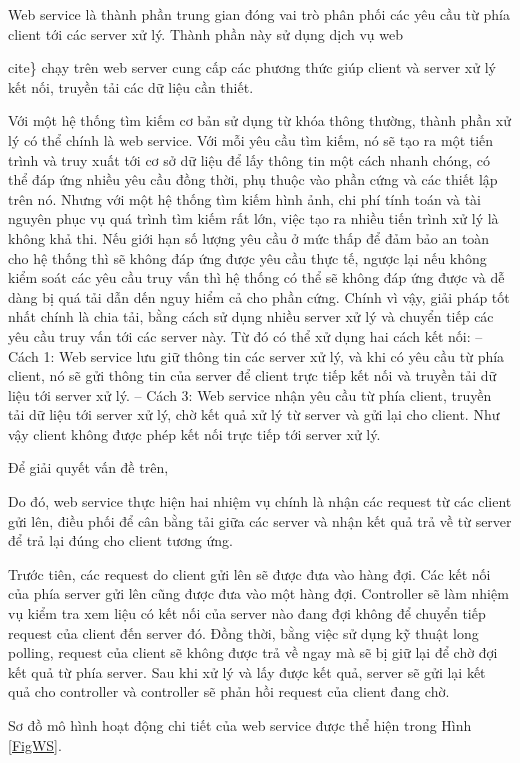 Web service là thành phần trung gian đóng vai trò phân phối các yêu cầu từ phía client tới các server xử lý. Thành phần này sử dụng dịch vụ web {cite\} chạy trên web server cung cấp các phương thức giúp client và server xử lý kết nối, truyền tải các dữ liệu cần thiết.

Với một hệ thống tìm kiếm cơ bản sử dụng từ khóa thông thường, thành phần xử lý có thể chính là web service. Với mỗi yêu cầu tìm kiếm, nó sẽ tạo ra một tiến trình và truy xuất tới cơ sở dữ liệu để lấy thông tin một cách nhanh chóng, có thể đáp ứng nhiều yêu cầu đồng thời, phụ thuộc vào phần cứng và các thiết lập trên nó. Nhưng với một hệ thống tìm kiếm hình ảnh, chi phí tính toán và tài nguyên phục vụ quá trình tìm kiếm rất lớn, việc tạo ra nhiều tiến trình xử lý là không khả thi. Nếu giới hạn số lượng yêu cầu ở mức thấp để đảm bảo an toàn cho hệ thống thì sẽ không đáp ứng được yêu cầu thực tế, ngược lại nếu không kiểm soát các yêu cầu truy vấn thì hệ thống có thể sẽ không đáp ứng được và dễ dàng bị quá tải dẫn dến nguy hiểm cả cho phần cứng. Chính vì vậy, giải pháp tốt nhất chính là chia tải, bằng cách sử dụng nhiều server xử lý và chuyển tiếp các yêu cầu truy vấn tới các server này. Từ đó có thể xử dụng hai cách kết nối:
-- Cách 1: Web service lưu giữ thông tin các server xử lý, và khi có yêu cầu từ phía client, nó sẽ gửi thông tin của server để client trực tiếp kết nối và truyền tải dữ liệu tới server xử lý.
-- Cách 3: Web service nhận yêu cầu từ phía client, truyền tải dữ liệu tới server xử lý, chờ kết quả xử lý từ server và gửi lại cho client. Như vậy client không được phép kết nối trực tiếp tới server xử lý.

Để giải quyết vấn đề trên, 

 Do đó, web service thực hiện hai nhiệm vụ chính là nhận các request từ các client gửi lên, điều phối để cân bằng tải giữa các server và nhận kết quả trả về từ server để trả lại đúng cho client tương ứng.

Trước tiên, các request do client gửi lên sẽ được đưa vào hàng đợi. Các kết nối của phía server gửi lên cũng được đưa vào một hàng đợi. Controller sẽ làm nhiệm vụ kiểm tra xem liệu có kết nối của server nào đang đợi không để chuyển tiếp request của client đến server đó. Đồng thời, bằng việc sử dụng kỹ thuật long polling, request của client sẽ không được trả về ngay mà sẽ bị giữ lại để chờ đợi kết quả từ phía server. Sau khi xử lý và lấy được kết quả, server sẽ gửi lại kết quả cho controller và controller sẽ phản hồi request của client đang chờ.

Sơ đồ mô hình hoạt động chi tiết của web service được thể hiện trong Hình \ref{FigWS}.

}
